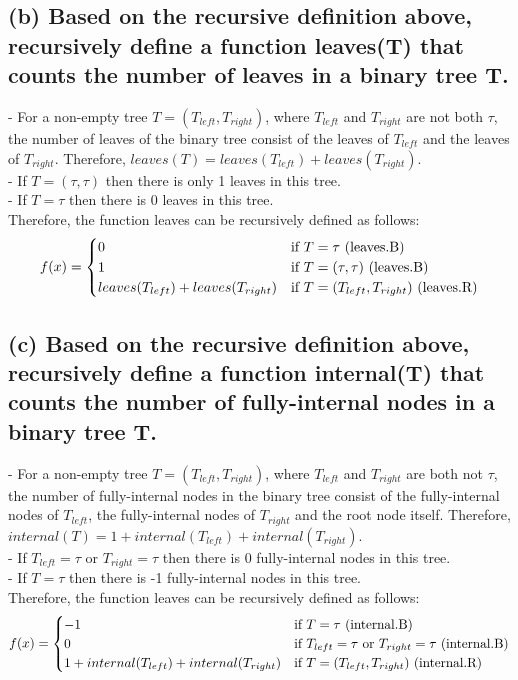 \documentclass[]{article}
\begin{document}
\begin{spacing}{1.5}
		\subsection*{(b) Based on the recursive definition above, recursively define a function leaves(T) that counts the number of leaves in a binary tree T.}
		- For a non-empty tree $ T = (T_{left}, T_{right}) $, where $ T_{left} $ and $ T_{right} $ are not both $ \tau $, the number of leaves of the binary tree consist of the leaves of $ T_{left} $ and the leaves of $ T_{right} $. Therefore, $ leaves(T) = leaves(T_{left}) + leaves(T_{right}) $.\\
		- If $ T = (\tau, \tau) $ then there is only 1 leaves in this tree. \\
		- If $ T = \tau $ then there is 0 leaves in this tree.\\
		Therefore, the function leaves can be recursively defined as follows:
		$$f(x)=
		\begin{cases}
			0& \text{if $ T = \tau $  (leaves.B)}\\
			1& \text{if $ T = (\tau, \tau) $  (leaves.B)}\\
			leaves(T_{left})+leaves(T_{right})& \text{if $ T=(T_{left}, T_{right}) $  (leaves.R)}
		\end{cases}$$
		
		\subsection*{(c) Based on the recursive definition above, recursively define a function internal(T) that counts the number of fully-internal nodes in a binary tree T.}
		- For a non-empty tree $ T = (T_{left}, T_{right}) $, where $ T_{left} $ and $ T_{right} $ are both not $ \tau $, the number of fully-internal nodes in the binary tree consist of the fully-internal nodes of $ T_{left} $,  the fully-internal nodes of $ T_{right} $ and the root node itself. Therefore, $ internal(T) = 1 + internal(T_{left}) + internal(T_{right}) $.\\
		- If $ T_{left} = \tau$ or $T_{right} = \tau $ then there is 0 fully-internal nodes in this tree. \\
		- If $ T = \tau $ then there is -1 fully-internal nodes in this tree.\\
		Therefore, the function leaves can be recursively defined as follows:
		$$f(x)=
		\begin{cases}
			-1& \text{if $ T = \tau $  (internal.B)}\\
			0& \text{if $ T_{left} = \tau$ or $T_{right} = \tau $  (internal.B)}\\
			1+internal(T_{left})+internal(T_{right})& \text{if $ T=(T_{left}, T_{right}) $  (internal.R)}
		\end{cases}$$
		

\end{spacing}
\end{document}

